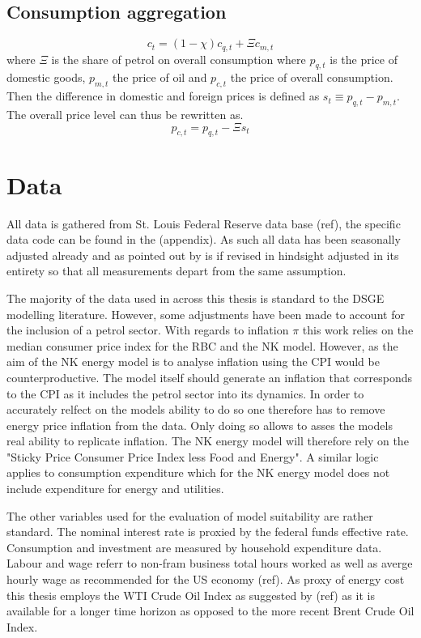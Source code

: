 \documentclass[12pt,a4paper,english]{article} %
\let\oldsection\section
\renewcommand\section{\clearpage\oldsection}
\begin{document}
	\subsection{Consumption aggregation}
	\begin{equation}
		c_t = (1 - \chi) c_{q,t} + \Xi c_{m, t}
	\end{equation}
	where $\Xi$ is the share of petrol on overall consumption
	where $p_{q,t}$ is the price of domestic goods, $p_{m,t}$ the price of oil and $p_{c,t}$ the price of overall consumption. Then the difference in domestic and foreign prices is defined as $s_t \equiv p_{q,t} - p_{m,t}$. The overall price level can thus be rewritten as. 
	\begin{equation}
		p_{c,t} = p_{q,t} - \Xi s_t
	\end{equation}
	
	
	
	\section{Data}
	
	All data is gathered from St. Louis Federal Reserve data base (ref), the specific data code can be found in the (appendix). As such all data has been seasonally adjusted already and as pointed out by \cite{pfeifer_guide_2021} is if revised in hindsight adjusted in its entirety so that all measurements depart from the same assumption.
	
	The majority of the data used in across this thesis is standard to the DSGE modelling literature. However, some adjustments have been made to account for the inclusion of a petrol sector.
	With regards to inflation $\pi$ this work relies on the median consumer price index for the RBC and the NK model. However, as the aim of the NK energy model is to analyse inflation using the CPI would be counterproductive. The model itself should generate an inflation that corresponds to the CPI as it includes the petrol sector into its dynamics. In order to accurately relfect on the models ability to do so one therefore has to remove energy price inflation from the data. Only doing so allows to asses the models real ability to replicate inflation. The NK energy model will therefore rely on the "Sticky Price Consumer Price Index less Food and Energy". A similar logic applies to consumption expenditure which for the NK energy model does not include expenditure for energy and utilities.
	
	The other variables used for the evaluation of model suitability are rather standard. The nominal interest rate is proxied by the federal funds effective rate. Consumption and investment are measured by household expenditure data. Labour and wage referr to non-fram business total hours worked as well as averge hourly wage as recommended for the US economy (ref). As proxy of energy cost this thesis employs the WTI Crude Oil Index as suggested by (ref) as it is available for a longer time horizon as opposed to the more recent Brent Crude Oil Index.
	
\end{document}
